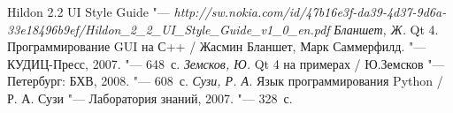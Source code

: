 \newpage
{}
\begin{thebibliography}{99}
Hildon 2.2 UI Style Guide "--- \textit{http://sw.nokia.com/id/47b16e3f-da39-4d37-9d6a-33e18496b9ef/Hildon\_2\_2\_UI\_Style\_Guide\_v1\_0\_en.pdf}
\textit {Бланшет, Ж.} Qt 4. Программирование GUI на С++ / Жасмин Бланшет, Марк Саммерфилд. "--- КУДИЦ-Пресс, 2007. "--- 648~с.
\textit {Земсков, Ю.} Qt 4 на примерах / Ю.Земсков "--- Петербург: БХВ, 2008. "--- 608~с.
\textit {Сузи, Р. А.} Язык программирования Python / Р. А. Сузи "--- Лаборатория знаний, 2007. "--- 328~с.


\end{thebibliography}
